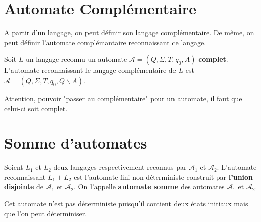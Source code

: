 
\section{Automate Complémentaire}

A partir d'un langage, on peut définir son langage complémentaire. De même, on peut définir l'automate complémantaire 
reconnaissant ce langage. 

\begin{definition}
    Soit $L$ un langage reconnu un automate $ \mathcal{A} = (Q,\Sigma,T,q_0,A)$ \textbf{complet}. 
    L'automate reconnaissant le langage complémentaire de $L$ est $ \overline{ \mathcal{A}} = (Q,\Sigma,T,q_0,Q \backslash A)$. 
\end{definition}

\begin{remark}
    Attention, pouvoir "passer au complémentaire" pour un automate, il faut que celui-ci soit complet. 
\end{remark}


\section{Somme d'automates}

\begin{definition}
    Soient $L_1$ et $L_2$ deux langages respectivement reconnus par $ \mathcal{A}_1$ et $ \mathcal{A}_2$. 
    L'automate reconnaissant $L_1 + L_2$ est l'automate fini non déterministe construit par \textbf{l'union disjointe}
    de $ \mathcal{A}_1$ et $ \mathcal{ A}_2$. On l'appelle \textbf{automate somme} des automates $ \mathcal{A}_1$ 
    et $ \mathcal{A}_2$. 
\end{definition}

Cet automate n'est pas déterministe puisqu'il contient deux états initiaux mais que l'on peut déterminiser. 


